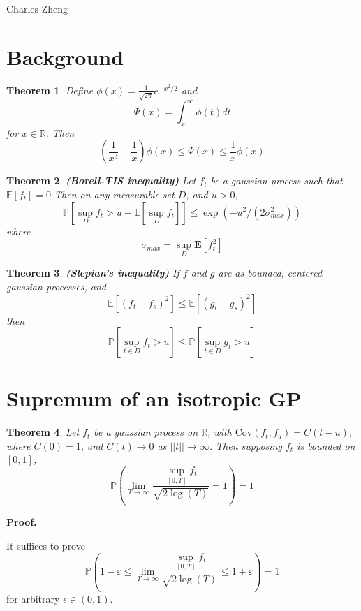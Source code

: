 \documentclass[11pt]{article}
\begin{document}
\newcommand{\tr}{\text{tr}}
\newcommand{\E}{\textbf{E}}
\newcommand{\diag}{\text{diag}}
\newcommand{\argmax}{\text{argmax}}
\newcommand{\Cov}{\text{Cov}}
\newcommand{\Var}{\text{Var}}
\newtheorem{theorem}{Theorem}

Charles Zheng

\section{Background}

\begin{theorem}
\label{bound}
Define $\phi(x) = \frac{1}{\sqrt{2\pi}}e^{-x^2/2}$ and
\[
\Psi(x) = \int_x^\infty \phi(t) dt
\]
for $x \in \mathbb{R}$.
Then
\[
\left(\frac{1}{x^3}-\frac{1}{x}\right) \phi(x) \leq \Psi(x) \leq \frac{1}{x}\phi(x)
\]
\end{theorem}

\begin{theorem}
\label{bt}
\textbf{(Borell-TIS inequality)}
Let $f_t$ be a gaussian process such that $\mathbb{E}[f_t] = 0$
Then on any measurable set $D$, and $u > 0$, 
\[
\mathbb{P}[\sup_D f_t > u + \mathbb{E}[\sup_D f_t]] \leq \exp(-u^2/(2\sigma_{max}^2))
\]
where
\[
\sigma_{max} = \sup_D \E[f_t^2]
\]
\end{theorem}

\begin{theorem}\label{slepian}
\textbf{(Slepian's inequality)}
If $f$ and $g$ are as bounded, centered gaussian processes, and
\[
\mathbb{E}[(f_t-f_s)^2] \leq \mathbb{E}[(g_t-g_s)^2]
\]
then
\[
\mathbb{P}[\sup_{t \in D} f_t  > u] \leq \mathbb{P}[\sup_{t \in D} g_t  > u]
\]
\end{theorem}

\section{Supremum of an isotropic GP}

\begin{theorem}
Let $f_t$ be a gaussian process on $\mathbb{R}$, with $\Cov(f_t,f_u)
= C(t-u)$, where $C(0) = 1$, and $C(t) \to 0$ as $||t|| \to \infty$.
Then supposing $f_t$ is bounded on $[0,1]$,
\[
\mathbb{P}\left(\lim_{T \to \infty}\frac{\sup_{[0,T]}
    f_t}{\sqrt{2 \log(T)}} = 1
\right) = 1
\]
\end{theorem}

\noindent\textbf{Proof.}

It suffices to prove
\[
\mathbb{P}\left( 1-\varepsilon \leq \lim_{T \to \infty}\frac{\sup_{[0,T]}
    f_t}{\sqrt{2 \log(T)}} \leq 1+\varepsilon
\right) = 1
\]
for arbitrary $\epsilon \in (0,1)$.
\end{document}
